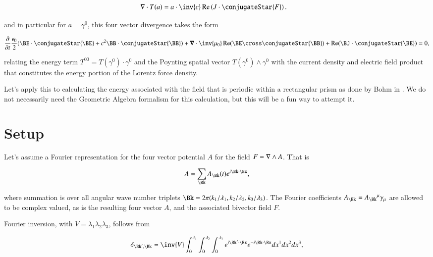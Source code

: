 \begin{align}\label{eqn:fourierMaxVac:3}
\grad \cdot T(a) &= a \cdot \inv{ c } \Real \left( J \cdot \conjugateStar{F} \right).
\end{align}

and in particular for $a = \gamma^0$, this four vector divergence takes the form

\begin{align}\label{eqn:fourierMaxVac:4}
\PD{t}{}\frac{\epsilon_0}{2}(\BE \cdot \conjugateStar{\BE} + c^2 \BB \cdot \conjugateStar{\BB})
+ \spacegrad \cdot \inv{\mu_0} \Real (\BE \cross \conjugateStar{\BB} )
+ \Real( \BJ \cdot \conjugateStar{\BE} ) 
= 0,
\end{align}

relating the energy term $T^{00} = T(\gamma^0) \cdot \gamma^0$ and the Poynting spatial vector $T(\gamma^0) \wedge \gamma^0$ with the current density and electric field product that constitutes the energy portion of the Lorentz force density.

Let's apply this to calculating the energy associated with the field that is periodic within a rectangular prism as done by Bohm in \citep{bohm1989qt}.  We do not necessarily need the Geometric Algebra formalism for this calculation, but this will be a fun way to attempt it.

\section{Setup}

Let's assume a Fourier representation for the four vector potential $A$ for the field $F = \nabla \wedge A$.  That is

\begin{align}
\label{eqn:fourierMaxVac:5}
A = \sum_{\Bk} A_\Bk(t) e^{i \Bk \cdot \Bx},
\end{align}

where summation is over all angular wave number triplets $\Bk = 2 \pi (k_1/\lambda_1, k_2/\lambda_2, k_3/\lambda_3)$.  The Fourier coefficients $A_\Bk = {A_\Bk}^\mu \gamma_\mu$ are allowed to be complex valued, as is the resulting four vector $A$, and the associated bivector field $F$.

Fourier inversion, with $V = \lambda_1 \lambda_2 \lambda_3$, follows from

\begin{align}\label{eqn:fourierMaxVac:6}
\delta_{\Bk', \Bk} =
\inv{ V }
\int_0^{\lambda_1}
\int_0^{\lambda_2}
\int_0^{\lambda_3} 
e^{ i \Bk' \cdot \Bx} 
e^{-i \Bk \cdot \Bx} dx^1 dx^2 dx^3,
\end{align}

